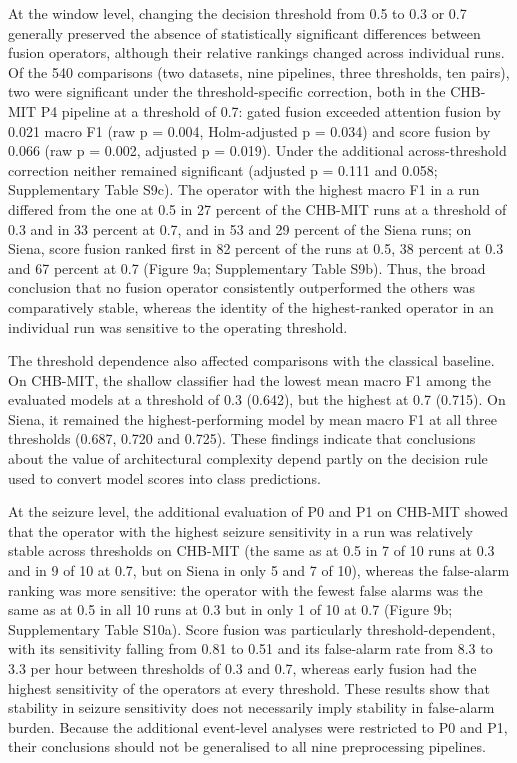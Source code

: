 \documentclass[11pt,a4paper]{article}
\begin{document}
At the window level, changing the decision threshold from 0.5 to 0.3 or 0.7 generally
preserved the absence of statistically significant differences between fusion operators,
although their relative rankings changed across individual runs. Of the 540 comparisons
(two datasets, nine pipelines, three thresholds, ten pairs), two were significant under
the threshold-specific correction, both in the CHB-MIT P4 pipeline at a threshold of 0.7:
gated fusion exceeded attention fusion by 0.021 macro F1 (raw p = 0.004, Holm-adjusted
p = 0.034) and score fusion by 0.066 (raw p = 0.002, adjusted p = 0.019). Under the
additional across-threshold correction neither remained significant (adjusted p = 0.111
and 0.058; Supplementary Table S9c). The operator with the highest macro F1 in a run
differed from the one at 0.5 in 27 percent of the CHB-MIT runs at a threshold of 0.3 and
in 33 percent at 0.7, and in 53 and 29 percent of the Siena runs; on Siena, score fusion
ranked first in 82 percent of the runs at 0.5, 38 percent at 0.3 and 67 percent at 0.7
(Figure 9a; Supplementary Table S9b). Thus, the broad conclusion that no fusion operator
consistently outperformed the others was comparatively stable, whereas the identity of
the highest-ranked operator in an individual run was sensitive to the operating
threshold.

The threshold dependence also affected comparisons with the classical baseline. On
CHB-MIT, the shallow classifier had the lowest mean macro F1 among the evaluated models at
a threshold of 0.3 (0.642), but the highest at 0.7 (0.715). On Siena, it remained the
highest-performing model by mean macro F1 at all three thresholds (0.687, 0.720 and
0.725). These findings indicate that conclusions about the value of architectural
complexity depend partly on the decision rule used to convert model scores into class
predictions.

At the seizure level, the additional evaluation of P0 and P1 on CHB-MIT showed that the
operator with the highest seizure sensitivity in a run was relatively stable across
thresholds on CHB-MIT (the same as at 0.5 in 7 of 10 runs at 0.3 and in 9 of 10 at 0.7, but on Siena in only 5 and 7 of 10), whereas the
false-alarm ranking was more sensitive: the operator with the fewest false alarms was the
same as at 0.5 in all 10 runs at 0.3 but in only 1 of 10 at 0.7 (Figure 9b; Supplementary
Table S10a). Score fusion was particularly threshold-dependent, with its sensitivity
falling from 0.81 to 0.51 and its false-alarm rate from 8.3 to 3.3 per hour between
thresholds of 0.3 and 0.7, whereas early fusion had the highest sensitivity of the
operators at every threshold. These results show that stability in seizure sensitivity
does not necessarily imply stability in false-alarm burden. Because the additional
event-level analyses were restricted to P0 and P1, their conclusions should not be
generalised to all nine preprocessing pipelines.
\end{document}
